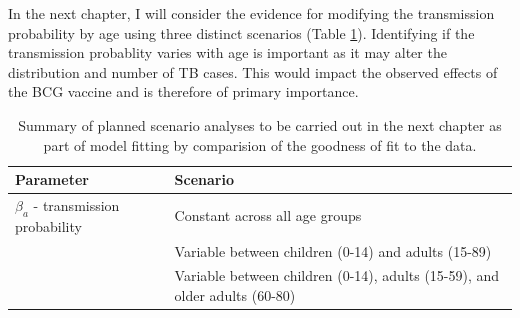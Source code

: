 \documentclass[11pt,twoside]{bristolthesis}
\begin{document}
  In the next chapter, I will consider the evidence for modifying the transmission probability by age using three distinct scenarios (Table \ref{tab:summary-scenarios}). Identifying if the transmission probablity varies with age is important as it may alter the distribution and number of TB cases. This would impact the observed effects of the BCG vaccine and is therefore of primary importance.
  \begin{table}[t]
  
  \caption{\label{tab:summary-scenarios}Summary of planned scenario analyses to be carried out in the next chapter as part of model fitting by comparision of the goodness of fit to the data.}
  \centering
  \begin{tabular}{>{\raggedright\arraybackslash}p{4cm}>{\raggedright\arraybackslash}p{8cm}}
  \toprule
  Parameter & Scenario\\
  \midrule
  $\beta_a$ - transmission probability & Constant across all age groups\\
   & Variable between children (0-14) and adults (15-89)\\
   & Variable between children (0-14), adults (15-59), and older adults (60-80)\\
  \bottomrule
  \end{tabular}
  \end{table}
\end{document}

